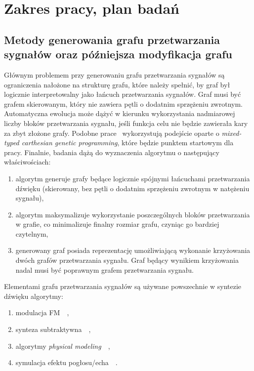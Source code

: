 \section{Zakres pracy, plan badań}\label{chap:thesis_scope}

\subsection{Metody generowania grafu przetwarzania sygnałów oraz późniejsza modyfikacja grafu}

Głównym problemem przy generowaniu grafu przetwarzania sygnałów są ograniczenia nałożone na strukturę grafu,
które należy spełnić, by graf był logicznie interpretowalny jako łańcuch przetwarzania sygnałów.
Graf musi być grafem skierowanym, który nie zawiera pętli o dodatnim sprzężeniu zwrotnym.
Automatyczna ewolucja może dążyć w kierunku wykorzystania nadmiarowej liczby
bloków przetwarzania sygnału, jeśli funkcja celu nie będzie zawierała kary za zbyt złożone grafy.
Podobne prace~\cite{evolutionary_puredata} wykorzystują podejście oparte o 
\textit{mixed-typed carthesian genetic programming}, które będzie punktem startowym dla pracy.
Finalnie, badania dążą do wyznaczenia algorytmu o następujący właściwościach:

\begin{enumerate}
    \item algorytm generuje grafy będące logicznie spójnymi łańcuchami przetwarzania dźwięku (skierowany, bez pętli o dodatnim sprzężeniu zwrotnym w natężeniu sygnału),
    \item algorytm maksymalizuje wykorzystanie poszczególnych bloków przetwarzania w grafie, co minimalizuje finalny rozmiar grafu, czyniąc go bardziej czytelnym,
    \item generowany graf posiada reprezentację umożliwiającą wykonanie krzyżowania dwóch grafów przetwarzania sygnału. Graf będący wynikiem krzyżowania nadal musi być poprawnym grafem przetwarzania sygnału.
\end{enumerate}

\noindent
Elementami grafu przetwarzania sygnałów są używane powszechnie w syntezie dźwięku algorytmy:

\begin{enumerate}
  \item modulacja FM~\cite{spectral_audio_processing}~\cite{computational_music_synthesis},
  \item synteza subtraktywna~\cite{computational_music_synthesis}~\cite{digital_filters},
  \item algorytmy \textit{physical modeling}~\cite{lisp_synthesis}~\cite{computational_music_synthesis},
  \item symulacja efektu pogłosu/echa~\cite{reverb}~\cite{freeverb}.
\end{enumerate}


